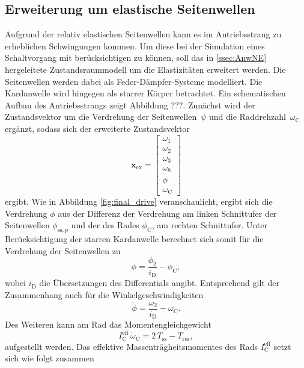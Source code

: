 \subsection{Erweiterung um elastische Seitenwellen}
Aufgrund der relativ elastischen Seitenwellen kann es im Antriebsstrang zu erheblichen Schwingungen kommen. Um diese bei der Simulation eines Schaltvorgang mit berücksichtigen zu können, soll das in \ref{ssec:AnwNE} hergeleitete Zustandsraummodell um die Elastizitäten erweitert werden. Die Seitenwellen werden dabei als Feder-Dämpfer-Systeme modelliert. Die Kardanwelle wird hingegen als starrer Körper betrachtet. Ein schematischen Aufbau des Antriebsstrangs zeigt Abbildung ???. Zunächst wird der Zustandsvektor um die Verdrehung der Seitenwellen~$\psi$ und die Raddrehzahl~$\omega_\mathrm{C}$ ergänzt, sodass sich der erweiterte Zustandsvektor
\begin{equation}
\pmb{x}_\mathrm{ex} = \begin{bmatrix} \omega_1 \\ \omega_2 \\ \omega_3 \\ \omega_8 \\ \phi \\ \omega_\mathrm{C} \end{bmatrix}
\end{equation}
ergibt. Wie in Abbildung \ref{fig:final_drive} veranschaulicht, ergibt sich die Verdrehung $\phi$ aus der Differenz der Verdrehung am linken Schnittufer der Seitenwellen $\phi_\mathrm{ss,p}$ und der des Rades $\phi_\mathrm{C}$, am rechten Schnittufer. Unter Berücksichtigung der starren Kardanwelle berechnet sich somit für die Verdrehung der Seitenwellen zu
\begin{equation}
\phi = \frac{\phi_2}{i_{\mathrm{D}}} - \phi_\mathrm{C},
\end{equation}  
wobei $i_{\mathrm{D}}$ die Übersetzungen des Differentials angibt. Entsprechend gilt der Zusammenhang auch für die Winkelgeschwindigkeiten
\begin{equation}\label{eq:dynphi}
\dot{\phi} = \frac{\omega_2}{i_{\mathrm{D}}} - \omega_\mathrm{C}.
\end{equation}
Des Weiteren kann am Rad das Momentengleichgewicht
\begin{equation}\label{eq:MggRad}
I^\mathrm{eff}_\mathrm{C}\,\dot{\omega}_\mathrm{C} = 2\,T_\mathrm{ss} - T_\mathrm{res},
\end{equation}
aufgestellt werden. Das effektive Massenträgheitsmomentes des Rads $I^\mathrm{eff}_\mathrm{C}$ setzt sich wie folgt zusammen
